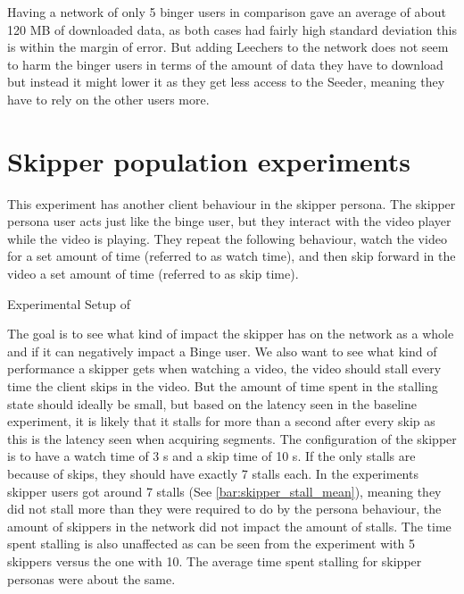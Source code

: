 \if{}

\fi

Having a network of only 5 binger users in comparison gave an average of about 120 \ac{MB} of downloaded data, as both cases had fairly high standard deviation this is within the margin of error. But adding Leechers to the network does not seem to harm the binger users in terms of the amount of data they have to download but instead it might lower it as they get less access to the Seeder, meaning they have to rely on the other users more.

\FloatBarrier \section{Skipper population experiments}
\label{sec:eval_skipper}
This experiment has another client behaviour in the skipper persona.
The skipper persona user acts just like the binge user, but they interact with the video player while the video is playing. They repeat the following behaviour, watch the video for a set amount of time (referred to as watch time), and then skip forward in the video a set amount of time (referred to as skip time).

\begin{table}[!htbp]
\myfloatalign
\caption[Experimental Setup of Skipper]{Experimental Setup of }
\label{tab:exp_overview_skipper}

\end{table}


The goal is to see what kind of impact the skipper has on the network as a whole and if it can negatively impact a Binge user. We also want to see what kind of performance a skipper gets when watching a video, the video should stall every time the client skips in the video. But the amount of time spent in the stalling state should ideally be small, but based on the latency seen in the baseline experiment, it is likely that it stalls for more than a second after every skip as this is the latency seen when acquiring segments. The configuration of the skipper is to have a watch time of 3 \ac{s} and a skip time of 10 \ac{s}. If the only stalls are because of skips, they should have exactly 7 stalls each.
In the experiments skipper users got around 7 stalls (See \autoref{bar:skipper_stall_mean}), meaning they did not stall more than they were required to do by the persona behaviour, the amount of skippers in the network did not impact the amount of stalls. The time spent stalling is also unaffected as can be seen from the experiment with 5 skippers versus the one with 10. The average time spent stalling for skipper personas were about the same.


